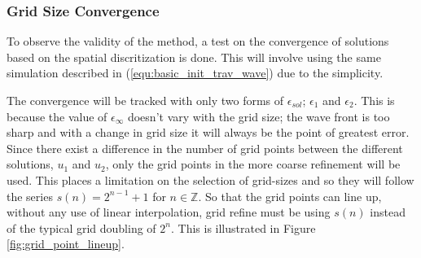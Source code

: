 
\subsubsection{Grid Size Convergence}
  To observe the validity of the method, a test on the convergence of solutions based on the spatial discritization is done.
  This will involve using the same simulation described in (\ref{equ:basic_init_trav_wave}) due to the simplicity. 
 
  The convergence will be tracked with only two forms of $\epsilon_{sol}$; $\epsilon_1$ and $\epsilon_2$.
  This is because the value of $\epsilon_{\infty}$ doesn't vary with the grid size; the wave front is too sharp and with a change in grid size it will always be the point of greatest error.
  Since there exist a difference in the number of grid points between the different solutions, $u_1$ and $u_2$, only the grid points in the more coarse refinement will be used.
  This places a limitation on the selection of grid-sizes and so they will follow the series $s(n) = 2^{n-1}+1$ for $n \in \mathbb{Z}$.
  So that the grid points can line up, without any use of linear interpolation, grid refine must be using $s(n)$ instead of the typical grid doubling of $2^{n}$. 
  This is illustrated in Figure \ref{fig:grid_point_lineup}.


